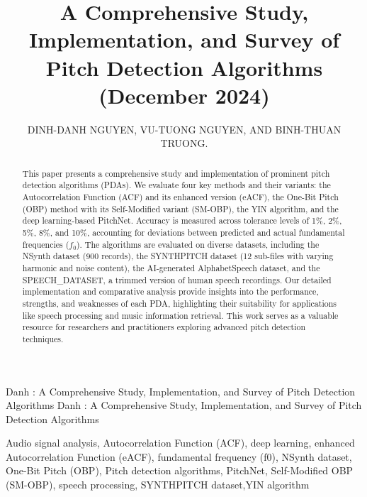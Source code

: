 \documentclass{ieeeaccess}
\begin{document}

\title{A Comprehensive Study, Implementation, and Survey of Pitch Detection Algorithms \\
(December 2024)}
\author{\uppercase{Dinh-Danh Nguyen},
\uppercase{Vu-Tuong Nguyen, and Binh-Thuan Truong}.}
\address[1]{Ton Duc Thang University}


\markboth
{Danh \headeretal: A Comprehensive Study, Implementation, and Survey of Pitch Detection Algorithms}
{Danh \headeretal: A Comprehensive Study, Implementation, and Survey of Pitch Detection Algorithms}


\begin{abstract}
This paper presents a comprehensive study and implementation of prominent pitch detection algorithms (PDAs). We evaluate four key methods and their variants: the Autocorrelation Function (ACF) and its enhanced version (eACF), the One-Bit Pitch (OBP) method with its Self-Modified variant (SM-OBP), the YIN algorithm, and the deep learning-based PitchNet. Accuracy is measured across tolerance levels of 1\%, 2\%, 5\%, 8\%, and 10\%, accounting for deviations between predicted and actual fundamental frequencies ($f_0$). The algorithms are evaluated on diverse datasets, including the NSynth dataset (900 records), the SYNTHPITCH dataset (12 sub-files with varying harmonic and noise content), the AI-generated AlphabetSpeech dataset, and the SPEECH\_DATASET, a trimmed version of human speech recordings. Our detailed implementation and comparative analysis provide insights into the performance, strengths, and weaknesses of each PDA, highlighting their suitability for applications like speech processing and music information retrieval. This work serves as a valuable resource for researchers and practitioners exploring advanced pitch detection techniques.
\end{abstract}


\begin{keywords}
Audio signal analysis, Autocorrelation Function (ACF), deep learning, enhanced Autocorrelation Function (eACF), fundamental frequency (f0), NSynth dataset, One-Bit Pitch (OBP), Pitch detection algorithms, PitchNet, Self-Modified OBP (SM-OBP), speech processing, SYNTHPITCH dataset,YIN algorithm 
\end{keywords}
\end{document}

